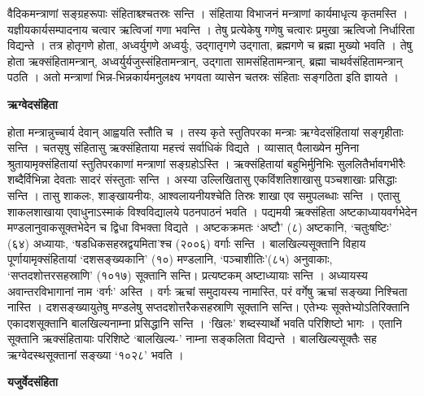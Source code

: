 \documentclass[11pt, a5paper]{article}
\newcommand{\customparagraph}[1]{
    \noindent \textbf{#1} \par
    \penalty 10000 %
    \vspace{0.1cm plus 0.05cm minus 0.02cm}
    \penalty 10000 %
}
\begin{document}
वैदिकमन्त्राणां सङ्‍ग्रहरूपाः संहिताश्च्श्चतस्रः सन्ति । संहिताया विभाजनं मन्त्राणां कार्यमाधृत्य कृतमस्ति ।  यज्ञीयकार्यसम्पादनाय चत्वार ऋत्विजां गणा भवन्ति । तेषु प्रत्येकेषु गणेषु चत्वारः प्रमुखा ऋत्विजो निर्धारिता विद्यन्ते । तत्र होतृगणे होता, अध्वर्युगणे अध्वर्युः, उद्‌गातृगणे उद्गाता, ब्रह्मगणे च ब्रह्मा मुख्यो भवति । तेषु होता ऋक्संहितामन्त्रान्, अध्वर्युर्यजुस्संहितामन्त्रान्, उद्गाता  सामसंहितामन्त्रान्, ब्रह्मा चाथर्वसंहितामन्त्रान् पठति । अतो मन्त्राणां  भिन्न-भिन्नकार्यमनुलक्ष्य भगवता व्यासेन चतस्रः संहिताः सङ्गठिता इति ज्ञायते ।

\customparagraph{\textbf{ऋग्वेदसंहिता}}

होता मन्त्रान्नुच्चार्य देवान् आह्वयति स्तौति च । तस्य कृते स्तुतिपरका मन्त्राः ऋग्वेदसंहितायां सङ्‌गृहीताः सन्ति । चतसृषु संहितासु ऋक्संहिताया महत्त्वं सर्वाधिकं विद्यते । व्यासात् पैलाख्येन मुनिना श्रुतायामृक्संहितायां स्तुतिपरकाणां मन्त्राणां सङ्‌‌ग्रहोऽस्ति । ऋक्संहितायां बहुभिर्मुनिभिः सुललितैर्भावगभीरैः शब्दैर्विभिन्ना देवताः सादरं संस्तुताः सन्ति । अस्या उल्लिखितासु एकविंशतिशाखासु पञ्चशाखाः प्रसिद्धाः सन्ति । तासु शाकलः, शाङ्‌खायनीयः, आश्वलायनीयश्चेति तिस्रः शाखा एव समुपलब्धाः सन्ति । एतासु शाकलशाखाया एवाधुनाऽस्माकं विश्वविद्यालये पठनपाठनं भवति । पद्यमयी ऋक्संहिता अष्टकाध्यायवर्गभेदेन मण्डलानुवाकसूक्तभेदेन च द्विधा विभक्ता विद्यते । अष्टकक्रमतः ‘अष्टौ’ (८) अष्टकानि, ‘चतुःषष्टिः’ (६४) अध्यायाः, ‘षडधिकसहस्रद्वयमिता’श्च (२००६) वर्गाः सन्ति । बालखिल्यसूक्तानि विहाय पूर्णायामृक्संहितायां ‘दशसङ्‌ख्यकानि’ (१०) मण्डलानि, ‘पञ्चाशीतिः’(८५) अनुवाकाः, ‘सप्तदशोत्तरसहस्राणि’ (१०१७) सूक्तानि सन्ति। प्रत्यष्टकम् अष्टाध्यायाः सन्ति । अध्यायस्य अवान्तरविभागानां नाम ‘वर्गः’ अस्ति । वर्गः ऋचां समुदायस्य नामास्ति, परं वर्गेषु ऋचां सङ्‌ख्या निश्चिता नास्ति । दशसङ्‌ख्यायुतेषु मण्डलेषु सप्तदशोत्तरैकसहस्राणि सूक्तानि सन्ति। एतेभ्यः सूक्तेभ्योऽतिरिक्तानि एकादशसूक्तानि बालखिल्यनाम्ना प्रसिद्धानि सन्ति । ‘खिलः’ शब्दस्यार्थो भवति परिशिष्टो भागः । एतानि सूक्तानि ऋक्संहितायाः परिशिष्टे ‘बालखिल्य-’ नाम्ना सङ्‌कलिता विद्यन्ते । बालखिल्यसूक्तैः सह ऋग्वेदस्थसूक्तानां सङ्ख्या ‘१०२८’ भवति ।

\customparagraph{\textbf{यजुर्वेदसंहिता}}
\end{document}
